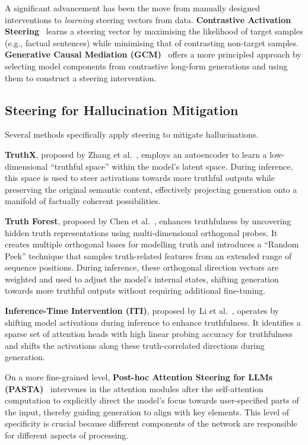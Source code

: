 A significant advancement has been the move from manually designed interventions to
\textit{learning} steering vectors from data. \textbf{Contrastive Activation
Steering}~\cite{ContrastiveSteering} learns a steering vector by maximising the likelihood of
target samples (e.g., factual sentences) while minimising that of contrasting non-target samples.
\textbf{Generative Causal Mediation (GCM)}~\cite{GCM} offers a more principled approach by
selecting model components from contrastive long-form generations and using them to construct a
steering intervention.


\subsection{Steering for Hallucination Mitigation}

Several methods specifically apply steering to mitigate hallucinations.

\textbf{TruthX}, proposed by Zhang et al.~\cite{TruthX}, employs an autoencoder to learn a
low-dimensional ``truthful space'' within the model's latent space. During inference, this space
is used to steer activations towards more truthful outputs while preserving the original semantic
content, effectively projecting generation onto a manifold of factually coherent possibilities.

\textbf{Truth Forest}, proposed by Chen et al.~\cite{TruthForest}, enhances truthfulness by
uncovering hidden truth representations using multi-dimensional orthogonal probes. It creates
multiple orthogonal bases for modelling truth and introduces a ``Random Peek'' technique that
samples truth-related features from an extended range of sequence positions. During inference,
these orthogonal direction vectors are weighted and used to adjust the model's internal states,
shifting generation towards more truthful outputs without requiring additional fine-tuning.

\textbf{Inference-Time Intervention (ITI)}, proposed by Li et al.~\cite{ITI}, operates by
shifting model activations during inference to enhance truthfulness. It identifies a sparse set of
attention heads with high linear probing accuracy for truthfulness and shifts the activations
along these truth-correlated directions during generation.

On a more fine-grained level, \textbf{Post-hoc Attention Steering for LLMs (PASTA)}~\cite{PASTA}
intervenes in the attention modules after the self-attention computation to explicitly direct the
model's focus towards user-specified parts of the input, thereby guiding generation to align with
key elements. This level of specificity is crucial because different components of the network are
responsible for different aspects of processing.


